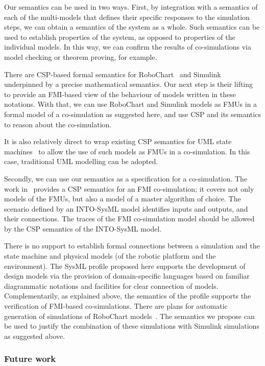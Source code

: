 Our semantics can be used in two ways. First, by integration with a semantics of each of the multi-models that defines their specific responses to the simulation steps, we can obtain a semantics of the system as a whole. Such semantics can be used to establish properties of the system, as opposed to properties of the individual models. In this way, we can confirm the results of co-simulations via model checking or theorem proving, for example.

There are CSP-based formal semantics for RoboChart~\cite{MiyazawaCRLWT2016} and Simu\-link~\cite{MarriottZC2012,CavalcantiMW2013} underpinned by a precise mathematical semantics. Our next step is their lifting to provide an FMI-based view of the behaviour of models written in these notations. With that, we can use RoboChart and Simulink models as FMUs in a formal model of a co-simulation as suggested here, and use CSP and its semantics to reason about the co-simulation.

It is also relatively direct to wrap existing CSP semantics for UML state machines~\cite{DaviesC2003,RaschW2005} to allow the use of such models as FMUs in a co-simulation. In this case, traditional UML modelling can be adopted.

Secondly, we can use our semantics as a specification for a co-simulation. The work in~\cite{CavalcantiWA16} provides a CSP semantics for an FMI co-simulation; it covers not only models of the FMUs, but also a model of a master algorithm of choice. The scenario defined by an INTO-SysML model identifies inputs and outputs, and their connections. The traces of the FMI co-simulation model should be allowed by the CSP semantics of the INTO-SysML model.

There is no support to establish formal connections between a simulation and the state machine and physical models (of the robotic platform and the environment). The SysML profile proposed here supports the development of design models via the provision of domain-specific languages based on familiar diagrammatic notations and facilities for clear connection of models. Complementarily, as explained above, the semantics of the profile supports the verification of FMI-based co-simulations.  There are plans for automatic generation of simulations of RoboChart models~\cite{CavalcantiWA16}. The semantics we propose can be used to justify the combination of these simulations with Simulink simulations as suggested above.

\subsubsection{Future work}

